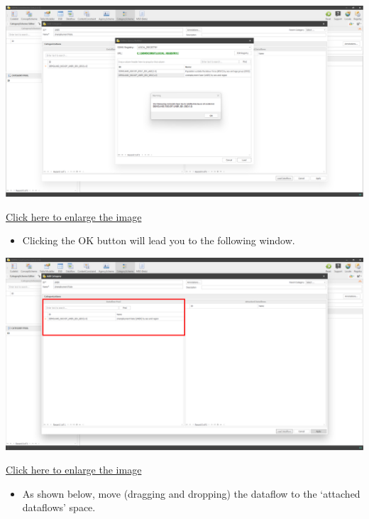 \documentclass[
]{book}
\providecommand{\tightlist}{%
  \setlength{\itemsep}{0pt}\setlength{\parskip}{0pt}}
\begin{document}
\begin{center}\includegraphics[width=1\linewidth]{./images/image172} \end{center}

\href{images/image172.png}{Click here to enlarge the image}

\begin{itemize}
\tightlist
\item
  Clicking the OK button will lead you to the following window.
\end{itemize}

\begin{center}\includegraphics[width=1\linewidth]{./images/image174} \end{center}

\href{images/image174.png}{Click here to enlarge the image}

\begin{itemize}
\tightlist
\item
  As shown below, move (dragging and dropping) the dataflow to the `attached dataflows' space.
\end{itemize}
\end{document}
